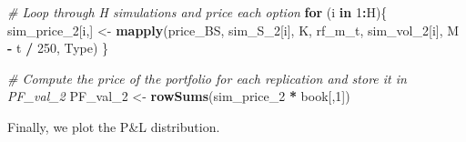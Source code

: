 \documentclass[]{article}
\newenvironment{Shaded}{\begin{snugshade}}{\end{snugshade}}
\newcommand{\CommentTok}[1]{\textcolor[rgb]{0.56,0.35,0.01}{\textit{#1}}}
\newcommand{\ControlFlowTok}[1]{\textcolor[rgb]{0.13,0.29,0.53}{\textbf{#1}}}
\newcommand{\DecValTok}[1]{\textcolor[rgb]{0.00,0.00,0.81}{#1}}
\newcommand{\KeywordTok}[1]{\textcolor[rgb]{0.13,0.29,0.53}{\textbf{#1}}}
\newcommand{\NormalTok}[1]{#1}
\newcommand{\OperatorTok}[1]{\textcolor[rgb]{0.81,0.36,0.00}{\textbf{#1}}}
\newcommand{\StringTok}[1]{\textcolor[rgb]{0.31,0.60,0.02}{#1}}
\begin{document}
\begin{Shaded}
\begin{Highlighting}[]
\CommentTok{\# Loop through H simulations and price each option}
\ControlFlowTok{for}\NormalTok{ (i }\ControlFlowTok{in} \DecValTok{1}\OperatorTok{:}\NormalTok{H)\{}
\NormalTok{  sim\_price\_}\DecValTok{2}\NormalTok{[i,] <{-}}\StringTok{ }\KeywordTok{mapply}\NormalTok{(price\_BS, sim\_S\_}\DecValTok{2}\NormalTok{[i], K, rf\_m\_t, sim\_vol\_}\DecValTok{2}\NormalTok{[i], M }\OperatorTok{{-}}\StringTok{ }\NormalTok{t }\OperatorTok{/}\StringTok{ }\DecValTok{250}\NormalTok{, Type)}
\NormalTok{\}}

\CommentTok{\# Compute the price of the portfolio for each replication and store it in \textquotesingle{}PF\_val\_2\textquotesingle{}}
\NormalTok{PF\_val\_}\DecValTok{2}\NormalTok{ <{-}}\StringTok{ }\KeywordTok{rowSums}\NormalTok{(sim\_price\_}\DecValTok{2} \OperatorTok{*}\StringTok{ }\NormalTok{book[,}\DecValTok{1}\NormalTok{])}
\end{Highlighting}
\end{Shaded}

Finally, we plot the P\&L distribution.
\end{document}
